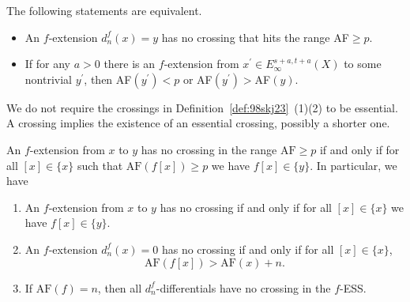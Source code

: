 \documentclass{amsart}
\numberwithin{equation}{section}
\newcommand{\AF}{\mathrm{AF}}
\begin{document}
\begin{remark}   

The following statements are equivalent.
\begin{itemize}
    \item An $f$-extension $d_n^{f}(x)=y$ has no crossing that hits the range AF$\ge p$. 
    \item If for any $a>0$ there is an $f$-extension from $x^\prime\in E_\infty^{s+a,t+a}(X)$ to some nontrivial $y^\prime$, then AF$(y^\prime)<p$ or AF$(y^\prime)>$AF$(y)$.
\end{itemize} 
\end{remark}
    
\begin{remark}   
We do not require the crossings in Definition~\ref{def:98skj23}~(1)(2) to be essential. A crossing implies the existence of an essential crossing, possibly a shorter one.
\end{remark}


\begin{proposition} \label{prop:i8r47oe}
    An $f$-extension from $x$ to $y$ has no crossing in the range $\AF\ge p$ if and only if for all $[x]\in \{x\}$ such that $\AF(f[x])\ge p$ we have $f[x]\in \{y\}$. In particular, we have
    \begin{enumerate}
        \item An $f$-extension from $x$ to $y$ has no crossing if and only if for all $[x]\in \{x\}$ we have $f[x]\in \{y\}$.
        \item An $f$-extension $d_n^{f}(x)=0$ has no crossing if and only if for all $[x]\in \{x\}$,
        $$\AF(f[x]) >\AF(x)+n.$$
        \item If $\AF(f)=n$, then all $d^f_n$-differentials have no crossing in the $f$-ESS.
    \end{enumerate}
\end{proposition}
\end{document}
